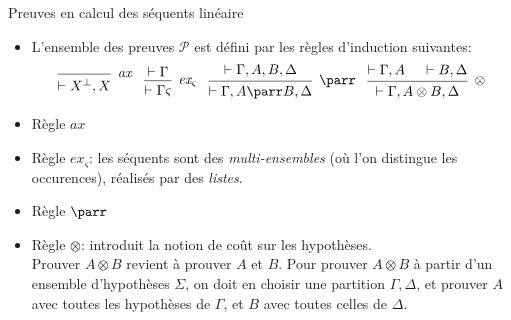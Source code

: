 \documentclass{beamer}
\newcommand*{\orth}{^\perp}
\newcommand*{\tensor}{\otimes}
\newcommand*{\hypv}[1]{\hypo{\vdash #1}}
\newcommand*{\axv}[1]{\infer{0}[\ensuremath{\mathit{ax}}]{\vdash #1}}
\newcommand*{\tensorv}[1]{\infer{2}[\ensuremath{\tensor}]{\vdash #1}}
\newcommand*{\parrv}[1]{\infer{1}[\ensuremath{\parr}]{\vdash #1}}
\newcommand*{\permv}[2]{\infer{1}[\ensuremath{\textit{ex}_{#1}}]{\vdash #2}}
\newcommand*{\permapp}[2]{#2 #1}
\newcommand*{\someperm}{\varsigma}
\newcommand*{\sequent}{\Gamma}
\newcommand*{\sequentbis}{\Delta}
\newcommand*{\proofs}{\ensuremath{\mathcal{P}}}
\begin{document}
\begin{frame}{Preuves en calcul des séquents linéaire}
    \begin{itemize}
        \item L'ensemble des preuves \proofs{} est défini par les règles d'induction suivantes:
            \begin{equation*}
            \begin{prooftree}
              \axv{X\orth, X}
            \end{prooftree}
            \; \; \;
            \begin{prooftree}
              \hypv{\sequent}
              \permv{\someperm}{\permapp{\someperm}{\sequent}}
            \end{prooftree}
            \; \; \;
            \begin{prooftree}
              \hypv{\sequent, A, B, \sequentbis}
              \parrv{\sequent, A \parr B, \sequentbis}
            \end{prooftree}
            \; \; \;
            \begin{prooftree}
              \hypv{\sequent, A}
              \hypv{B, \sequentbis}
              \tensorv{\sequent, A \tensor B, \sequentbis}
            \end{prooftree}
            \end{equation*}
            \pause
        \item Règle $\mathit{ax}$
            \pause
        \item Règle $\textit{ex}_{\someperm}$: les séquents sont des \textit{multi-ensembles} (où l'on distingue les occurences), réalisés par des \textit{listes}.
            \pause
        \item Règle $\parr$
            \pause
        \item Règle $\tensor$: introduit la notion de coût sur les hypothèses.\\
        Prouver $A \tensor B$ revient à prouver $A$ et $B$. Pour prouver $A \tensor B$ à partir d'un ensemble d'hypothèses $\Sigma$, on doit en choisir une partition $\sequent, \sequentbis$, et prouver $A$ avec toutes les hypothèses de $\sequent$, et $B$ avec toutes celles de $\sequentbis$.
    \end{itemize}
\end{frame}
\end{document}
